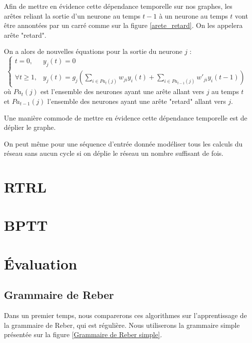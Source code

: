 \documentclass{report}
\theoremstyle{plain}
\theoremstyle{definition}
\theoremstyle{remark}
\begin{document}
Afin de mettre en évidence cette dépendance temporelle sur nos graphes, les arêtes reliant la sortie d'un neurone au temps $t-1$ à un neurone au temps $t$ vont être annontées par un carré comme sur la figure \ref{arete_retard}. On les appelera arête "retard".


On a alors de nouvelles équations pour la sortie du neurone $j$ :
\begin{equation}
\left\{
\begin{array}{ll}
t = 0, & y_j(t) = 0 \\
\forall t \geq 1, & y_{j}(t) = g_{j}(\sum_{i \in Pa_t(j)}{w_{ji}y_{i}(t)} + \sum_{i \in Pa_{t-1}(j)}{w'_{ji}y_{i}(t-1)})
\end{array}
\right.
\end{equation}
où $Pa_t(j)$ est l'ensemble des neurones ayant une arête allant vers $j$ au temps $t$ et $Pa_{t-1}(j)$ l'ensemble des neurones ayant une arête "retard" allant vers $j$.

Une manière commode de mettre en évidence cette dépendance temporelle est de déplier le graphe. 


On peut même pour une séquence d'entrée donnée modéliser tous les calculs du réseau sans aucun cycle si on déplie le réseau un nombre suffisant de fois.



\section{RTRL}

\section{BPTT}

\section{Évaluation}

\subsection{Grammaire de Reber}

Dans un premier temps, nous comparerons ces algorithmes sur l'apprentissage de la grammaire de Reber, qui est régulière. Nous utiliserons la grammaire simple présentée sur la figure \ref{Grammaire de Reber simple}.
\end{document}

